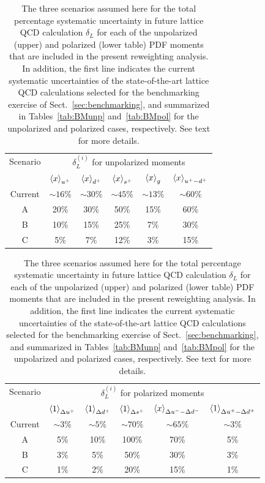 \begin{table}[t]
  \centering
  \renewcommand{\arraystretch}{1.3} 
  \begin{tabular}{c||ccccc}
    \hline
    Scenario &  \multicolumn{5}{c}{$\delta_L^{(i)}$ for unpolarized moments}   \\
&    $\left\langle x\right\rangle_{u^+}$  &   $\left\langle x\right\rangle_{d^+}$   &  $\left\langle x\right\rangle_{s^+}$  &
$\left\langle x\right\rangle_{g}$  &   $\left\langle x\right\rangle_{u^+-d^+}$  \\
    \hline
    Current  & $\sim 16\%$  &  $\sim 30\%$
    & $\sim 45\%$  & $\sim 13\%$  &  $\sim 60\%$ \\
    A   & 20\%  & 30\% &  50\% &  15\% &  60\% \\
 B   & 10\%  & 15\% &  25\% &  7\% &  30\%  \\
  C   & 5\%  & 7\% &  12\% &  3\% &  15\%  \\
    \hline
  \end{tabular}\vspace{0.7cm}
   \begin{tabular}{c||ccccc}
    \hline
    Scenario   &
    \multicolumn{5}{c}{$\delta_L^{(i)}$ for polarized moments} \\ 
& $\left\langle 1\right\rangle_{\Delta u^+}$  & $\left\langle 1\right\rangle_{\Delta d^+}$  & $\left\langle 1\right\rangle_{\Delta s^+}$
&  $\left\langle x\right\rangle_{\Delta u^--\Delta d^-}$  &  $\left\langle 1\right\rangle_{\Delta u^+ - \Delta d^+}$\\
    \hline
    Current  &
    $\sim 3\%$  & $\sim 5\%$ & $\sim 70\%$ & $\sim 65\%$ & $\sim 3\%$ \\
    \hline
    A   & 
    5\% &    10\%  &   100\% &    70\%  &    5\% \\
 B   &
 3\% &    5\%  &   50\% &    30\%  &    3\% \\
  C   & 1\% &    2\%  &   20\% &    15\%  &    1\% \\
    \hline
  \end{tabular}
   \caption{\small The three scenarios assumed here
     for the total percentage
     systematic uncertainty
    in future lattice QCD calculation $\delta_L$ for each
    of the unpolarized (upper) and polarized (lower table) PDF
    moments that are included
    in the present reweighting analysis.
    In addition, the first line indicates the current systematic
    uncertainties of the state-of-the-art lattice QCD calculations
    selected for the benchmarking exercise of Sect.~\ref{sec:benchmarking},
    and summarized in Tables~\ref{tab:BMunp} and~\ref{tab:BMpol}
    for the unpolarized and polarized cases, respectively.
    See text for more details.
\label{tab:scenarios}
  }
\end{table}

